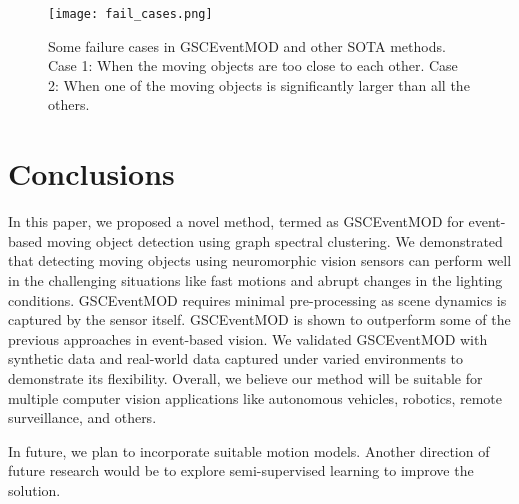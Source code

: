 \documentclass{article}
\begin{document}
\begin{figure*}
\begin{center}
\texttt{[image: fail\_cases.png]}
\end{center}
   \caption{Some failure cases in GSCEventMOD and other SOTA methods. Case 1: When the moving objects are too close to each other.  Case 2: When one of the moving objects is significantly larger than all the others.}
   \label{fig:fail cases}
\end{figure*}

\section{Conclusions}
In this paper, we proposed a novel method, termed as GSCEventMOD for event-based moving object detection using graph spectral clustering. We demonstrated that detecting moving objects using neuromorphic vision sensors can perform well in the challenging situations like fast motions and abrupt changes in the lighting conditions. GSCEventMOD requires minimal pre-processing as scene dynamics is captured by the sensor itself. GSCEventMOD is shown to outperform some of the previous approaches in event-based vision. We validated GSCEventMOD with synthetic data and real-world data captured under varied environments to demonstrate its flexibility. Overall, we believe our method will be suitable for multiple computer vision applications like autonomous vehicles, robotics, remote surveillance, and others.

In future, we plan to incorporate suitable motion models. Another direction of future research would be to explore semi-supervised learning to improve the solution.  



  
\end{document}
